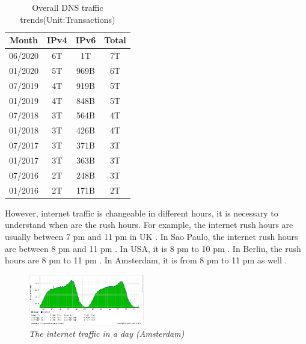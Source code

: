 \documentclass[conference]{IEEEtran}
\begin{document}
\begin{table}[hbt!]
    \centering
    \begin{tabular}{|c|c|c|c|}
        \hline
         Month & IPv4 & IPv6 & Total\\
        \hline
         06/2020 & 6T & 1T & 7T \\
        \hline
        01/2020 & 5T & 969B & 6T\\
        \hline
        07/2019 & 4T & 919B & 5T \\
        \hline
        01/2019 & 4T & 848B & 5T \\
        \hline
        07/2018 & 3T & 564B & 4T \\
        \hline
        01/2018 & 3T & 426B & 4T \\
        \hline
        07/2017 & 3T & 371B & 3T \\
        \hline
        01/2017 & 3T & 363B & 3T \\
        \hline
        07/2016 & 2T & 248B & 3T \\
        \hline
        01/2016 & 2T & 171B & 2T \\
        \hline
    \end{tabular}
    \caption{Overall DNS traffic trends(Unit:Transactions) \cite{overall_DNS_traffic_trends}}
    \label{tab:DNS_traffic_trends}
\end{table}

However, internet traffic is changeable in different hours, it is necessary to understand when are the rush hours. For example, the internet rush hours are usually between 7 pm and 11 pm in UK \cite{Avoiding_the_internet_rush_hour}. In Sao Paulo, the internet rush hours are between 8 pm and 11 pm \cite{Brazil_internet_rush_hour}. In USA, it is 8 pm to 10 pm \cite{Measuring_broadband_america}. In Berlin, the rush hours are 8 pm to 11 pm \cite{Berlin_internet_traffic}. In Amsterdam, it is from 8 pm to 11 pm as well \cite{Amsterdam_internet_traffic}.
\\

\begin{figure}[hbt!]
    \centering
    \includegraphics[width=0.45\textwidth]{figure/amsterdam-day.png}
    \caption{\em The internet traffic in a day (Amsterdam) \cite{Amsterdam_internet_traffic} \label{fig:internet_traffic_day_Amsterdam}}
\end{figure}
\end{document}
